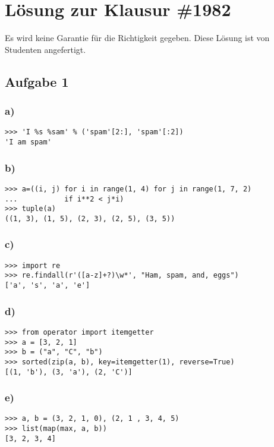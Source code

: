 \documentclass{scrartcl}
\begin{document}
\section*{Lösung zur Klausur \#1982}

Es wird keine Garantie für die Richtigkeit gegeben.
Diese Lösung ist von Studenten angefertigt.
\subsection*{Aufgabe 1}
\subsubsection*{a)}
\begin{lstlisting}
>>> 'I %s %sam' % ('spam'[2:], 'spam'[:2])
'I am spam'
\end{lstlisting}

\subsubsection*{b)}
\begin{lstlisting}
>>> a=((i, j) for i in range(1, 4) for j in range(1, 7, 2)
...           if i**2 < j*i)
>>> tuple(a)
((1, 3), (1, 5), (2, 3), (2, 5), (3, 5))
\end{lstlisting}

\subsubsection*{c)}
\begin{lstlisting}
>>> import re
>>> re.findall(r'([a-z]+?)\w*', "Ham, spam, and, eggs")
['a', 's', 'a', 'e']
\end{lstlisting}

\subsubsection*{d)}
\begin{lstlisting}
>>> from operator import itemgetter
>>> a = [3, 2, 1]
>>> b = ("a", "C", "b")
>>> sorted(zip(a, b), key=itemgetter(1), reverse=True)
[(1, 'b'), (3, 'a'), (2, 'C')]
\end{lstlisting}

\subsubsection*{e)}
\begin{lstlisting}
>>> a, b = (3, 2, 1, 0), (2, 1 , 3, 4, 5)
>>> list(map(max, a, b))
[3, 2, 3, 4]
\end{lstlisting}
\end{document}
